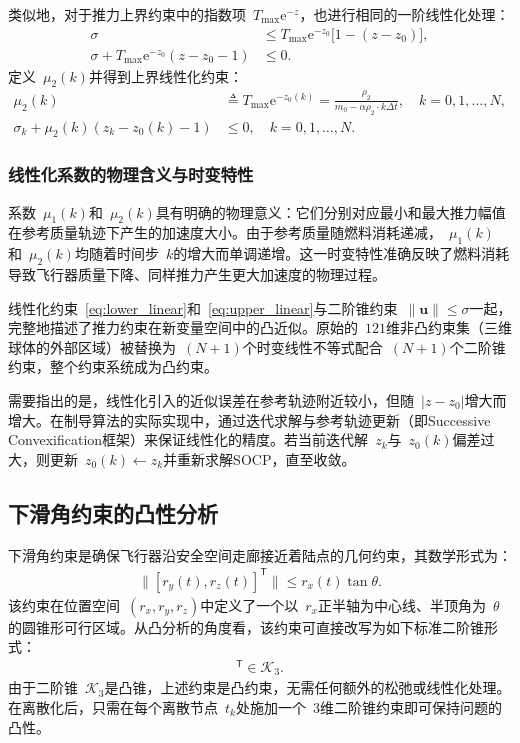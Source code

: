 类似地，对于推力上界约束中的指数项~$T_{\max}\mathrm{e}^{-z}$，也进行相同的一阶线性化处理：
\begin{align}
\sigma &\le T_{\max}\mathrm{e}^{-z_0}\bigl[1-(z-z_0)\bigr],\\
\sigma + T_{\max}\mathrm{e}^{-z_0}(z - z_0 - 1) &\le 0.
\end{align}
定义~$\mu_2(k)$并得到上界线性化约束：
\begin{align}
\mu_2(k) &\triangleq T_{\max}\mathrm{e}^{-z_0(k)} = \frac{\rho_2}{m_0 - \alpha \rho_2\cdot k\Delta t},\quad k=0,1,\dots,N,\\
\sigma_k + \mu_2(k)(z_k - z_0(k) - 1) &\le 0,\quad k=0,1,\dots,N.\label{eq:upper_linear}
\end{align}

\subsubsection{线性化系数的物理含义与时变特性}

系数~$\mu_1(k)$和~$\mu_2(k)$具有明确的物理意义：它们分别对应最小和最大推力幅值在参考质量轨迹下产生的加速度大小。由于参考质量随燃料消耗递减，~$\mu_1(k)$和~$\mu_2(k)$均随着时间步~$k$的增大而单调递增。这一时变特性准确反映了燃料消耗导致飞行器质量下降、同样推力产生更大加速度的物理过程。

线性化约束~\eqref{eq:lower_linear}和~\eqref{eq:upper_linear}与二阶锥约束~$\|\bm u\|\le\sigma$一起，完整地描述了推力约束在新变量空间中的凸近似。原始的~$121$维非凸约束集（三维球体的外部区域）被替换为~$(N+1)$个时变线性不等式配合~$(N+1)$个二阶锥约束，整个约束系统成为凸约束。

需要指出的是，线性化引入的近似误差在参考轨迹附近较小，但随~$|z-z_0|$增大而增大。在制导算法的实际实现中，通过迭代求解与参考轨迹更新（即Successive Convexification框架）来保证线性化的精度。若当前迭代解~$z_k$与~$z_0(k)$偏差过大，则更新~$z_0(k)\leftarrow z_k$并重新求解SOCP，直至收敛。

\subsection{下滑角约束的凸性分析}\label{sec:glideslope}

下滑角约束是确保飞行器沿安全空间走廊接近着陆点的几何约束，其数学形式为：
\begin{align}
\|[r_y(t), r_z(t)]^{\mathsf T}\| \le r_x(t)\tan\theta.
\end{align}
该约束在位置空间~$(r_x,r_y,r_z)$中定义了一个以~$r_x$正半轴为中心线、半顶角为~$\theta$的圆锥形可行区域。从凸分析的角度看，该约束可直接改写为如下标准二阶锥形式：
\begin{align}
[r_x(t)\tan\theta,\; r_y(t),\; r_z(t)]^{\mathsf T} \in \mathcal K_3.
\end{align}
由于二阶锥~$\mathcal K_3$是凸锥，上述约束是凸约束，无需任何额外的松弛或线性化处理。在离散化后，只需在每个离散节点~$t_k$处施加一个~$3$维二阶锥约束即可保持问题的凸性。


